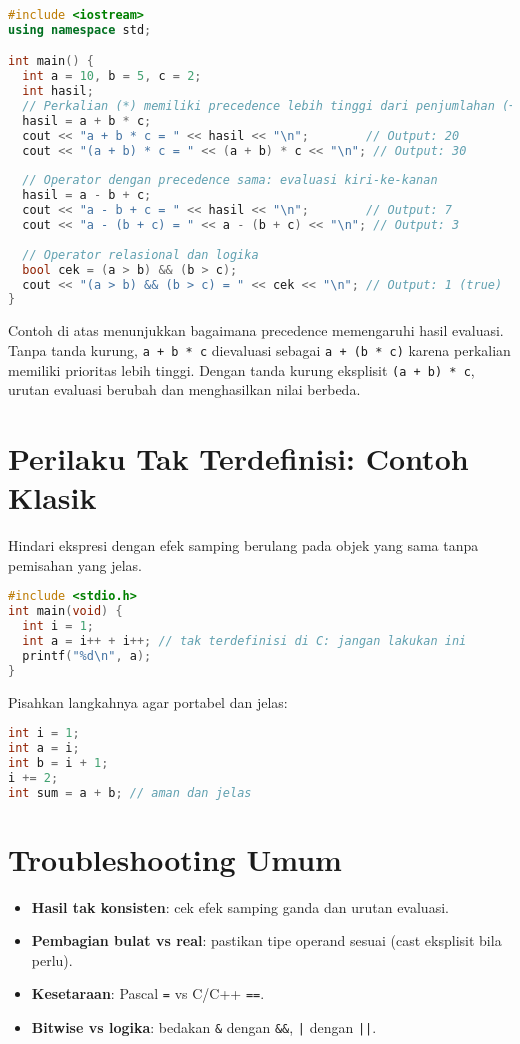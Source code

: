 \documentclass[../main.tex]{subfiles}
\begin{document}
\begin{lstlisting}[language=C++, caption={Precedence operator di C++}]
#include <iostream>
using namespace std;

int main() {
  int a = 10, b = 5, c = 2;
  int hasil;
  // Perkalian (*) memiliki precedence lebih tinggi dari penjumlahan (+)
  hasil = a + b * c;
  cout << "a + b * c = " << hasil << "\n";        // Output: 20
  cout << "(a + b) * c = " << (a + b) * c << "\n"; // Output: 30
  
  // Operator dengan precedence sama: evaluasi kiri-ke-kanan
  hasil = a - b + c;
  cout << "a - b + c = " << hasil << "\n";        // Output: 7
  cout << "a - (b + c) = " << a - (b + c) << "\n"; // Output: 3
  
  // Operator relasional dan logika
  bool cek = (a > b) && (b > c);
  cout << "(a > b) && (b > c) = " << cek << "\n"; // Output: 1 (true)
}
\end{lstlisting}

Contoh di atas menunjukkan bagaimana precedence memengaruhi hasil evaluasi. Tanpa tanda kurung, \texttt{a + b * c} dievaluasi sebagai \texttt{a + (b * c)} karena perkalian memiliki prioritas lebih tinggi. Dengan tanda kurung eksplisit \texttt{(a + b) * c}, urutan evaluasi berubah dan menghasilkan nilai berbeda.

\section{Perilaku Tak Terdefinisi: Contoh Klasik}
Hindari ekspresi dengan efek samping berulang pada objek yang sama tanpa pemisahan yang jelas.

\begin{lstlisting}[language=C, caption={Contoh UB: increment dan penggunaan berulang}]
#include <stdio.h>
int main(void) {
  int i = 1;
  int a = i++ + i++; // tak terdefinisi di C: jangan lakukan ini
  printf("%d\n", a);
}
\end{lstlisting}

Pisahkan langkahnya agar portabel dan jelas:
\begin{lstlisting}[language=C]
int i = 1;
int a = i;
int b = i + 1;
i += 2;
int sum = a + b; // aman dan jelas
\end{lstlisting}

\section{Troubleshooting Umum}
\begin{itemize}
  \item \textbf{Hasil tak konsisten}: cek efek samping ganda dan urutan evaluasi.
  \item \textbf{Pembagian bulat vs real}: pastikan tipe operand sesuai (cast eksplisit bila perlu).
  \item \textbf{Kesetaraan}: Pascal \texttt{=} vs C/C++ \texttt{==}.
  \item \textbf{Bitwise vs logika}: bedakan \texttt{\&} dengan \texttt{\&\&}, \texttt{|} dengan \texttt{||}.
\end{itemize}
\end{document}

